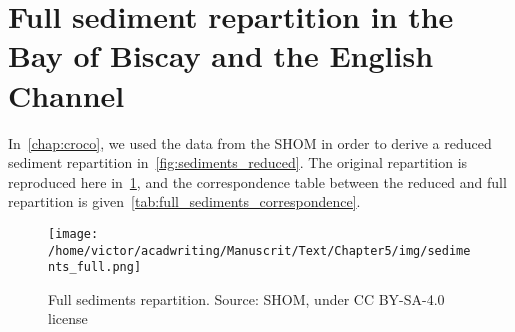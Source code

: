\documentclass[../../Main_ManuscritThese.tex]{subfiles}
\begin{document}
\section{Full sediment repartition in the Bay of Biscay and the English Channel}
\label{sec:sediments_full}
In~\cref{chap:croco}, we used the data from the SHOM in order to
derive a reduced sediment repartition
in~\cref{fig:sediments_reduced}. The original repartition is
reproduced here in~\cref{fig:sediments_full}, and the correspondence
table between the reduced and full repartition is
given~\cref{tab:full_sediments_correspondence}.
\begin{figure}[ht]
  \centering
  \texttt{[image: /home/victor/acadwriting/Manuscrit/Text/Chapter5/img/sediments\_full.png]}
  \caption[Full sediments repartition]{\label{fig:sediments_full} Full sediments
    repartition. Source: SHOM, under CC BY-SA-4.0 license}
\end{figure}
\begin{table}[ht]
\caption{\label{tab:full_sediments_correspondence}Correspondence
  between the full sediments repartition classes and the segmentation
  used in~\cref{chap:croco}}
\end{table}
\end{document}
